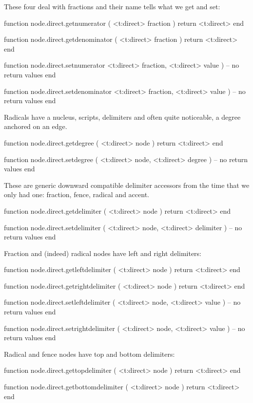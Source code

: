 These four deal with fractions and their name tells what we get and set:

\starttyping[option=LUA]
function node.direct.getnumerator ( <t:direct> fraction )
    return <t:direct>
end

function node.direct.getdenominator ( <t:direct> fraction )
    return <t:direct>
end

function node.direct.setnumerator
    <t:direct> fraction,
    <t:direct> value
)
    -- no return values
end

function node.direct.setdenominator
    <t:direct> fraction,
    <t:direct> value
)
    -- no return values
end
\stoptyping

Radicals have a nucleus, scripts, delimiters and often quite noticeable, a degree anchored
on an edge.

\starttyping[option=LUA]
function node.direct.getdegree ( <t:direct> node )
    return <t:direct>
end

function node.direct.setdegree ( <t:direct> node, <t:direct> degree )
    -- no return values
end
\stoptyping

These are generic downward compatible delimiter accessors from the time that we
only had one: fraction, fence, radical and accent.

\starttyping[option=LUA]
function node.direct.getdelimiter ( <t:direct> node )
    return <t:direct>
end

function node.direct.setdelimiter ( <t:direct> node, <t:direct> delimiter )
    -- no return values
end
\stoptyping

Fraction and (indeed) radical nodes have left and right delimiters:

\starttyping[option=LUA]
function node.direct.getleftdelimiter ( <t:direct> node )
    return <t:direct>
end

function node.direct.getrightdelimiter ( <t:direct> node )
    return <t:direct>
end

function node.direct.setleftdelimiter (
    <t:direct> node,
    <t:direct> value
)
    -- no return values
end

function node.direct.setrightdelimiter (
    <t:direct> node,
    <t:direct> value
)
    -- no return values
end
\stoptyping

Radical and fence nodes have top and bottom delimiters:

\starttyping[option=LUA]
function node.direct.gettopdelimiter ( <t:direct> node )
    return <t:direct>
end

function node.direct.getbottomdelimiter ( <t:direct> node )
    return <t:direct>
end

